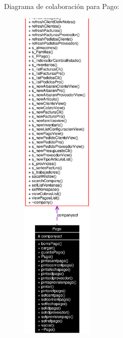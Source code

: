 Diagrama de colaboraci\'{o}n para Pago:\begin{figure}[H]
\begin{center}
\leavevmode
\includegraphics[width=99pt]{classPago__coll__graph}
\end{center}
\end{figure}
